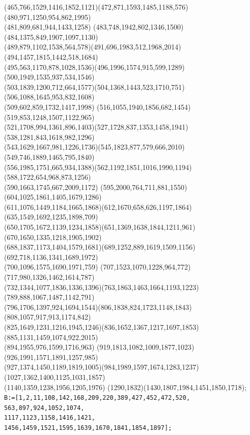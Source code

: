 \documentclass[a4paper,twopage,reqno,12pt]{amsart}
\theoremstyle{definition}
\numberwithin{equation}{section}
\begin{document}
\begin{enumerate}
{{(465,766,1529,1416,1852,1121)(472,871,1593,1485,1188,576)(480,971,1250,954,862,1995)\\(481,809,681,944,1433,1258)
(483,748,1942,802,1346,1500)(484,1375,849,1907,1097,1130)\\(489,879,1102,1538,564,578)(491,696,1983,512,1968,2014)
(494,1457,1815,1442,518,1684)\\(495,563,1170,878,1028,1536)(496,1996,1574,915,599,1289)(500,1949,1535,937,534,1546)\\
(503,1839,1200,712,664,1577)(504,1368,1443,523,1710,751)(506,1088,1645,953,832,1608)\\(509,602,859,1732,1417,1998)
(516,1055,1940,1856,682,1454)(519,853,1248,1507,1122,965)\\(521,1708,994,1361,896,1403)(527,1728,837,1353,1458,1941)
(538,1281,843,1618,982,1296)\\(543,1629,1667,981,1226,1736)(545,1823,877,579,666,2010)(549,746,1889,1465,795,1840)\\
(556,1985,1751,665,934,1388)(562,1192,1851,1016,1990,1194)(588,1722,654,968,873,1256)\\(590,1663,1745,667,2009,1172)
(595,2000,764,711,881,1550)(604,1025,1861,1405,1679,1286)\\(611,1076,1449,1184,1665,1868)(612,1670,658,626,1197,1864)
(635,1549,1692,1235,1898,709)\\(650,1705,1672,1139,1234,1858)(651,1369,1638,1844,1211,961)(670,1650,1335,1218,1905,1902)\\
(688,1837,1173,1404,1579,1681)(689,1252,889,1619,1509,1156)(692,718,1136,1341,1689,1972)\\(700,1096,1575,1690,1971,759)
(707,1523,1070,1228,964,772)(717,980,1326,1462,1614,787)\\(732,1344,1077,1836,1336,1396)(763,1863,1463,1664,1193,1223)
(789,888,1067,1487,1142,791)\\(796,1706,1397,924,1694,1544)(806,1838,824,1723,1148,1843)(808,1057,917,913,1174,842)\\
(825,1649,1231,1216,1945,1246)(836,1652,1367,1217,1697,1853)(885,1131,1459,1074,922,2015)\\(894,1955,976,1599,1716,963)
(919,1813,1082,1009,1877,1023)(926,1991,1571,1891,1257,985)\\(927,1374,1450,1189,1819,1005)(984,1989,1597,1674,1283,1237)
(1027,1362,1400,1125,1031,1857)\\(1140,1359,1238,1956,1205,1976)
(1290,1832)(1430,1807,1984,1451,1850,1718);}}\\
\texttt{B:=[1,2,11,108,142,168,209,220,389,427,452,472,520,
563,897,924,1052,1074,\\1117,1123,1158,1416,1421,
1456,1459,1521,1595,1639,1670,1841,1854,1897];}\\


\end{enumerate}
\end{document}
